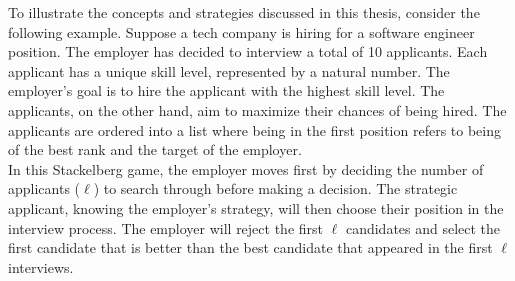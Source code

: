 \documentclass{article}
\begin{document}
To illustrate the concepts and strategies discussed in this thesis, consider the following example. Suppose a tech company is hiring for a software engineer position. The employer has decided to interview a total of 10 applicants. Each applicant has a unique skill level, represented by a natural number. The employer's goal is to hire the applicant with the highest skill level. The applicants, on the other hand, aim to maximize their chances of being hired. The applicants are ordered into a list where being in the first position refers to being of the best rank and the target of the employer.
\\[2ex]
In this Stackelberg game, the employer moves first by deciding the number of applicants ($\ell$) to search through before making a decision. The strategic applicant, knowing the employer's strategy, will then choose their position in the interview process. The employer will reject the first $\ell$ candidates and select the first candidate that is better than the best candidate that appeared in the first $\ell$ interviews.
\end{document}

